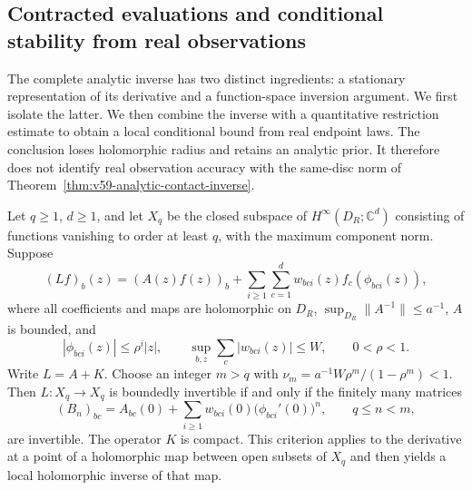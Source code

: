 \subsection{Contracted evaluations and conditional stability from real observations}
\label{subsec:v60-real-observation}

The complete analytic inverse has two distinct ingredients: a stationary
representation of its derivative and a function-space inversion argument.
We first isolate the latter.  We then combine the inverse with a quantitative
restriction estimate to obtain a local conditional bound from real endpoint
laws.  The conclusion loses holomorphic radius and retains an analytic
prior.  It therefore does not identify real observation accuracy with the
same-disc norm of Theorem~\ref{thm:v59-analytic-contact-inverse}.

\begin{proposition}
\label{prop:v60-contracted-criterion}
Let $q\ge1$, $d\ge1$, and let $X_q$ be the closed subspace of
$H^\infty(D_R;\mathbb C^d)$ consisting of functions vanishing to order
at least $q$, with the maximum component norm.  Suppose
\begin{equation}\label{eq:v60-abstract-operator}
 (Lf)_b(z)=(A(z)f(z))_b+
       \sum_{i\ge1}\sum_{c=1}^d w_{bci}(z)f_c(\phi_{bci}(z)),
\end{equation}
where all coefficients and maps are holomorphic on $D_R$,
$\sup_{D_R}\|A^{-1}\|\le a^{-1}$, $A$ is bounded, and
\[
 |\phi_{bci}(z)|\le\rho^i|z|,\qquad
 \sup_{b,z}\sum_c|w_{bci}(z)|\le W,\qquad 0<\rho<1.
\]
Write $L=A+K$.  Choose an integer $m>q$ with
$\nu_m=a^{-1}W\rho^m/(1-\rho^m)<1$.
Then $L:X_q\to X_q$ is boundedly invertible if and only if the
finitely many matrices
\begin{equation}\label{eq:v60-graded-blocks}
 (B_n)_{bc}=A_{bc}(0)+
       \sum_{i\ge1}w_{bci}(0)\bigl(\phi_{bci}'(0)\bigr)^n,
                      \qquad q\le n<m,
\end{equation}
are invertible.  The operator $K$ is compact.  This criterion applies
to the derivative at a point of a holomorphic map between open subsets
of $X_q$ and then yields a local holomorphic inverse of that map.
\end{proposition}

